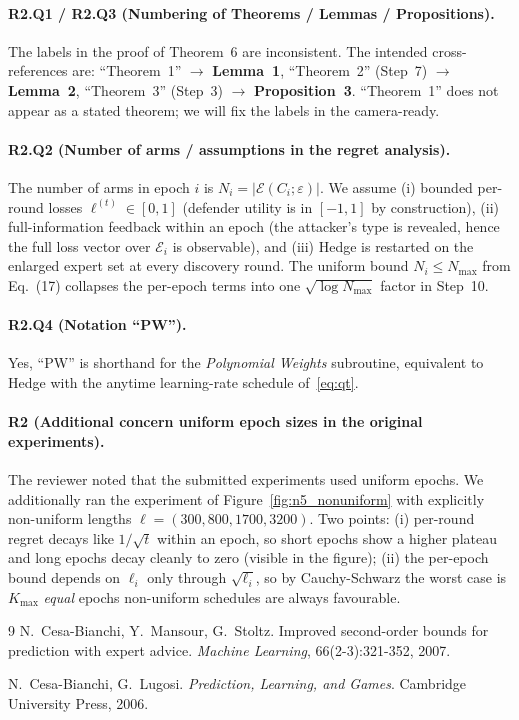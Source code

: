 \documentclass[11pt]{article}
\begin{document}
\paragraph{R2.Q1 / R2.Q3 (Numbering of Theorems / Lemmas / Propositions).}
The labels in the proof of Theorem~6 are inconsistent. The intended
cross-references are: ``Theorem~1'' $\to$ \textbf{Lemma~1}, ``Theorem~2''
(Step~7) $\to$ \textbf{Lemma~2}, ``Theorem~3'' (Step~3) $\to$
\textbf{Proposition~3}. ``Theorem~1'' does not appear as a stated
theorem; we will fix the labels in the camera-ready.

\paragraph{R2.Q2 (Number of arms / assumptions in the regret analysis).}
The number of arms in epoch $i$ is $N_i=|\mathcal E(C_i;\varepsilon)|$.
We assume (i) bounded per-round losses $\ell^{(t)}\in[0,1]$ (defender
utility is in $[-1,1]$ by construction), (ii) full-information feedback
within an epoch (the attacker's type is revealed, hence the full loss
vector over $\mathcal E_i$ is observable), and (iii) Hedge is restarted
on the enlarged expert set at every discovery round. The uniform bound
$N_i\le N_{\max}$ from Eq.~(17) collapses the per-epoch terms into one
$\sqrt{\log N_{\max}}$ factor in Step~10.

\paragraph{R2.Q4 (Notation ``PW'').}
Yes, ``PW'' is shorthand for the \emph{Polynomial Weights}
subroutine, equivalent to Hedge with the anytime learning-rate
schedule of~\eqref{eq:qt}.

\paragraph{R2 (Additional concern  uniform epoch sizes in the original experiments).}
The reviewer noted that the submitted experiments used uniform epochs.
We additionally ran the experiment of Figure~\ref{fig:n5_nonuniform}
with explicitly non-uniform lengths $\ell=(300,800,1700,3200)$. Two
points: (i) per-round regret decays like $1/\sqrt{t}$ within an epoch,
so short epochs show a higher plateau and long epochs decay cleanly
to zero (visible in the figure); (ii) the per-epoch bound depends on
$\ell_i$ only through $\sqrt{\ell_i}$, so by Cauchy-Schwarz the
worst case is $K_{\max}$ \emph{equal} epochs non-uniform schedules
are always favourable.

\begin{thebibliography}{9}
N.~Cesa-Bianchi, Y.~Mansour, G.~Stoltz.
\newblock Improved second-order bounds for prediction with expert advice.
\newblock \emph{Machine Learning}, 66(2-3):321-352, 2007.

N.~Cesa-Bianchi, G.~Lugosi.
\newblock \emph{Prediction, Learning, and Games}.
\newblock Cambridge University Press, 2006.
\end{thebibliography}
\end{document}
